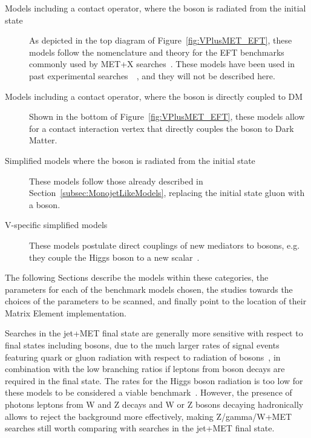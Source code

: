 \begin{description}
 \item[Models including a contact operator, where the boson is radiated from the initial state] As depicted in 
 the top diagram of Figure~\ref{fig:VPlusMET_EFT}, these models follow the nomenclature and theory 
 for the EFT benchmarks commonly used by MET+X searches~\cite{Goodman:2010ku}. These models
 have been used in past experimental searches~~\cite{Khachatryan:2014rwa, Aad:2014vka,Khachatryan:2014tva, Aad:2014vka, 
 ATLAS:2014wra, Aad:2013oja}, and they will not be described here. 
 \item[Models including a contact operator, where the boson is directly coupled to DM]
 Shown in the bottom of Figure~\ref{fig:VPlusMET_EFT},
 these models allow for a contact interaction vertex that directly couples the boson to Dark Matter. 
 \item[Simplified models where the boson is radiated from the initial state] These models follow those
 already described in Section~\ref{subsec:MonojetLikeModels}, replacing the initial state gluon with a boson.
 \item[V-specific simplified models] These models postulate direct couplings of new mediators
 to bosons, e.g. they couple the Higgs boson to a new scalar~\cite{Carpenter:2013xra}. 
\end{description}

The following Sections describe the models within these categories, 
the parameters for each of the benchmark models chosen,
the studies towards the choices of the parameters to be scanned, 
and finally point to the location of their Matrix Element 
implementation. 


Searches in the jet+MET final state are generally more sensitive
with respect to final states including bosons, due to the much 
larger rates of signal events featuring quark or gluon radiation with 
respect to radiation of bosons~\cite{Zhou:2013fla}, 
in combination with the low branching ratios if leptons from 
boson decays are required in the final state. 
The rates for the Higgs boson radiation is too low for these models 
to be considered a viable benchmark~\cite{Carpenter:2013xra}.
However, the presence of photons
leptons from W and Z decays
and W or Z bosons decaying hadronically
allows to reject the background more effectively, making Z/gamma/W+MET searches 
still worth comparing with searches in the jet+MET final state. 

